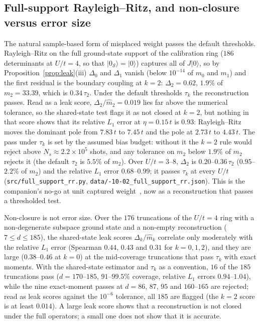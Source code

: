 \documentclass[submission, PhysCore]{SciPost}
\begin{document}
\subsection{Full-support Rayleigh--Ritz, and non-closure versus error size}
\label{sec:rr}
The natural sample-based form of misplaced weight passes the default thresholds. Rayleigh--Ritz on the full ground-state support of the calibration ring ($186$ determinants at $U/t=4$, so that $|0_\mathcal S\rangle=|0\rangle$) captures all of $J|0\rangle$, so by Proposition~\ref{prop:leak}(iii) $\Delta_0$ and $\Delta_1$ vanish (below $10^{-14}$ of $m_0$ and $m_1$) and the first residual is the boundary coupling at $k=2$: $\Delta_2=0.62$, $1.9\%$ of ${m_2=33.39}$, which is $0.34\,\tau_2$. Under the default thresholds $\tau_k$ the reconstruction passes. Read as a leak score, $\Delta_2/\widehat m_2=0.019$ lies far above the numerical tolerance, so the shared-state test flags it as not closed at $k=2$, but nothing in that score shows that its relative $L_1$ error at $\eta=0.15\,t$ is $0.93$: Rayleigh--Ritz moves the dominant pole from $7.83\,t$ to $7.45\,t$ and the pole at $2.73\,t$ to $4.43\,t$. The pass under $\tau_k$ is set by the assumed bias budget: without it the $k=2$ rule would reject above $N_s\approx2.2\times10^5$ shots, and any tolerance on $m_2$ below $1.9\%$ of $m_2$ rejects it (the default $\tau_2$ is $5.5\%$ of $m_2$). Over $U/t=3$--$8$, $\Delta_2$ is $0.20$--$0.36\,\tau_2$ ($0.95$--$2.2\%$ of $m_2$) and the relative $L_1$ error $0.68$--$0.99$; it passes $\tau_k$ at every $U/t$ (\texttt{src/\allowbreak full\_support\_rr.py}, \texttt{data/-10-02\_full\_support\_rr.json}). This is the companion's no-go at unit captured weight~\cite{SQDspec2608}, now as a reconstruction that passes a thresholded test.

Non-closure is not error size. Over the $176$ truncations of the $U/t=4$ ring with a non-degenerate subspace ground state and a non-empty reconstruction ($7\le d\le185$), the shared-state leak scores $\Delta_k/\widehat m_k$ correlate only moderately with the relative $L_1$ error (Spearman $0.44$, $0.43$ and $0.31$ for $k=0,1,2$), and they are large ($0.38$--$0.46$ at $k=0$) at the mid-coverage truncations that pass $\tau_k$ with exact moments. With the shared-state estimator and $\tau_k$ as a convention, $16$ of the $185$ truncations pass ($d=170$--$185$, $91$--$99.5\%$ coverage, relative $L_1$ errors $0.94$--$1.04$), while the nine exact-moment passes at $d=86$, $87$, $95$ and $160$--$165$ are rejected; read as leak scores against the $10^{-6}$ tolerance, all $185$ are flagged (the $k=2$ score is at least $0.014$). A large leak score shows that a reconstruction is not closed under the full operators; a small one does not show that it is accurate.
\end{document}
